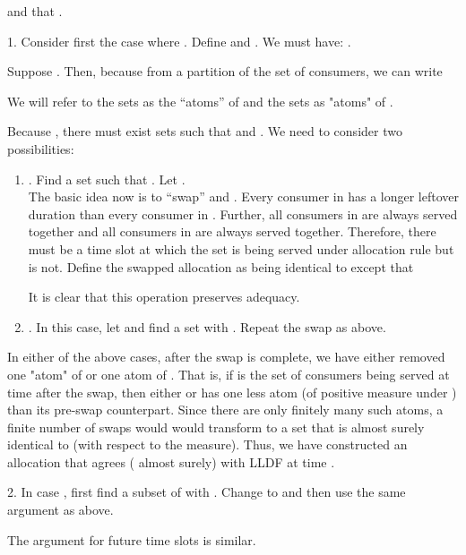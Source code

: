 \documentclass[10pt,draftcls,onecolumn]{IEEEtran}
\newcounter{l1}
\newcounter{l2}
\newcounter{l3}
\begin{document}
and that .


1. Consider first the case where  . 
Define  and .
We must have:
.

Suppose . Then, because  from a partition of the set of consumers, we can write




We will refer to the sets  as the ``atoms'' of  and the sets  as "atoms" of .

Because , there must exist sets  such that  and . 
We need to consider two possibilities:

\begin{enumerate}
\item . Find a set  such that . Let .
~\\

The basic idea now is to ``swap''  and . 
Every consumer in  has a longer leftover duration than every consumer in . Further, all consumers in  are always served together and all consumers in  are always served together.  Therefore, there must be a time slot  at which the set  is being served under allocation rule  but  is not.  
Define the swapped allocation  as being identical to  except that 

 
It is clear that this operation preserves adequacy.
\item . In this case, let  and find a set  with . Repeat the swap as above.

\end{enumerate}

In either of the above cases, after the swap is complete, we have either removed one "atom" of  or one atom of .  That is, if  is the set of consumers being served at time  after the swap, then either  or  has one less atom (of positive measure under ) than its pre-swap counterpart. Since there are only finitely many such atoms, a finite number of swaps would would transform  to a set that is almost surely identical to  (with respect to the  measure). Thus, we have constructed an allocation that agrees ( almost surely) with LLDF at time . 

2. In case , first find a subset  of  with . Change  to  and then use the same argument as above.

The argument for future time slots is similar.


\end{document}
